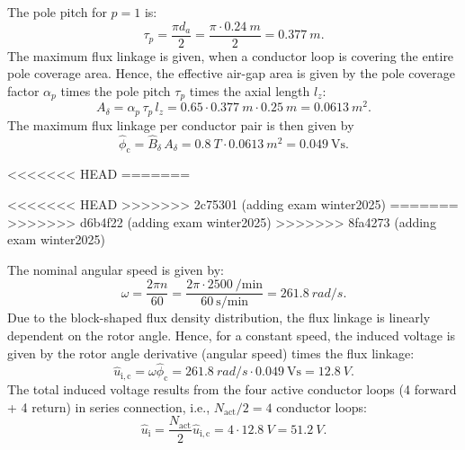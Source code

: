 
\begin{solutionblock}
	The pole pitch for $p=1$ is:
	\[
		\tau_p=\frac{\pi d_a}{2}=\frac{\pi\cdot \SI{0.24}{m}}{2}=\SI{0.377}{m}.
	\]
	The maximum flux linkage is given, when a conductor loop is covering the entire pole coverage area. Hence, the effective air-gap area is given by the pole coverage factor $\alpha_p$ times the pole pitch $\tau_p$ times the axial length $l_z$:
	\[
		A_\delta=\alpha_p\,\tau_p\,l_z=0.65\cdot \SI{0.377}{m}\cdot \SI{0.25}{m}=\SI{0.0613}{m^2}.
	\]
	The maximum flux linkage per conductor pair is then given by
	\[
		\hat{\phi}_\mathrm{c}=\hat{B}_\delta\,A_\delta
		=\SI{0.8}{T}\cdot \SI{0.0613}{m^2}
		=\SI{0.049}{\volt\second}.
	\]
\end{solutionblock}



<<<<<<< HEAD
=======

<<<<<<< HEAD
>>>>>>> 2c75301 (adding exam winter2025)
=======
>>>>>>> d6b4f22 (adding exam winter2025)
>>>>>>> 8fa4273 (adding exam winter2025)
\begin{solutionblock}
	The nominal angular speed is given by:
	\[
		\omega=\frac{2\pi n}{60}=\frac{2\pi\cdot \SI{2500}{\per\minute}}{\SI{60}{\second\per\minute}}=\SI{261.8}{rad/s}.
	\]
	Due to the block-shaped flux density distribution, the flux linkage is linearly dependent on the rotor angle. Hence, for a constant speed, the induced voltage is given by the rotor angle derivative (angular speed) times the flux linkage:
	\[
		\hat{u}_{\mathrm{i,c}}=\omega \hat{\phi}_\mathrm{c}=\SI{261.8}{rad/s}\cdot \SI{0.049}{\volt\second}=\SI{12.8}{V}.
	\]
	The total induced voltage results from the four active conductor loops (4 forward + 4 return) in series connection, i.e., $N_{\mathrm{act}}/2=4$ conductor loops:
	\[
		\hat{u}_{\mathrm{i}} = \frac{N_{\mathrm{act}}}{2}\hat{u}_{\mathrm{i,c}} = 4\cdot \SI{12.8}{V}=\SI{51.2}{V}.
	\]
\end{solutionblock}